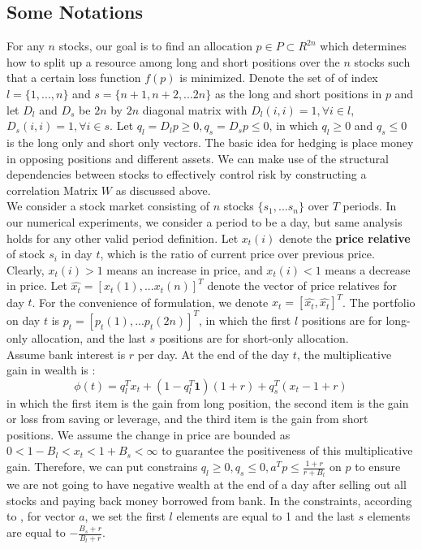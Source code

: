 \subsection{Some Notations}
    \noindent For any $n$ stocks, our goal is to find an allocation $p \in P \subset R^{2n}$ which determines how to split up a resource among long and short positions over the $n$ stocks such that a certain loss function $f(p)$ is minimized. Denote the set of of index $l=\{1,...,n\}$ and $s=\{n+1, n+2, ... 2n\}$ as the long and short positions in $p$ and let $D_l$ and $D_s$ be $2n$ by $2n$ diagonal matrix with $D_l(i,i)=1, \forall i\in l$, $D_s(i,i)=1, \forall i\in s$. Let $q_l = D_lp \geq 0, q_s = D_sp \leq
    0$, in which $q_l \geq 0$ and $q_s \leq 0$ is the long only and short only vectors. The basic idea for hedging is place money in opposing positions and different assets. We can make use of the structural dependencies between stocks to effectively control risk by constructing a correlation Matrix $W$ as discussed above.\\

    \noindent We consider a stock market consisting of $n$ stocks $\{s_1,...s_n\}$ over $T$ periods. In our numerical experiments, we consider a period to be a day, but same analysis holds for any other valid period definition. Let $x_t(i)$ denote the \textbf{price relative} of stock $s_i$ in day $t$, which is the ratio of current price over previous price. Clearly, $x_t(i) > 1$ means an increase in price, and $x_t(i) < 1$ means a decrease in price. Let 
    $\hat{x_t} = [x_t(1),...x_t(n)]^T$ denote the vector of price relatives for day $t$. For the convenience of formulation, we denote $x_t = [\hat{x_t}, \hat{x_t}]^T$. The portfolio on day $t$ is $p_t = [p_t(1),...p_t(2n)]^T$, in which the first $l$ positions are for long-only allocation, and the last $s$ positions are for short-only allocation.\\

    \noindent Assume bank interest is $r$ per day. At the end of the day $t$, the multiplicative gain in wealth is :
    $$\phi (t) = q_l^Tx_t + (1-q_l^T\textbf{1})(1+r) + q_s^T(x_t-1+r)$$
    in which the first item is the gain from long position, the second item is the gain or loss from saving or leverage, and the third item is the gain from short positions. We assume the change in price are bounded as $ 0 < 1 - B_l < x_t < 1 + B_s < \infty$ to guarantee the positiveness of this multiplicative gain. Therefore, we can put constrains $q_l \geq 0, q_s \leq 0, a^Tp \leq \frac{1+r}{r+B_l}$ on $p$ to ensure we are not going to have negative wealth at the end of a day after selling out all stocks and paying back money borrowed from bank. In the constraints, according to \cite{johnson2015structured}, for vector $a$, we set the first $l$ elements are equal to 1 and the last $s$ elements are equal to $-\frac{B_s+r}{B_l+r}$.\\ 


